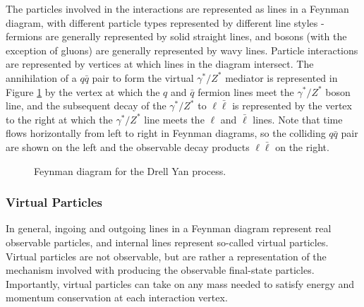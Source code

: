 The particles involved in the interactions are represented as lines in a Feynman diagram, with different particle types represented by different line styles - fermions are generally represented by solid straight lines, and bosons (with the exception of gluons) are generally represented by wavy lines. Particle interactions are represented by vertices at which lines in the diagram intersect. The annihilation of a \(q\bar{q}\) pair to form the virtual \(\gamma^{*}/Z^{*}\) mediator is represented in Figure \ref{fig:drell_yan} by the vertex at which the \(q\) and \(\bar{q}\) fermion lines meet the \(\gamma^{*}/Z^{*}\) boson line, and the subsequent decay of the  \(\gamma^{*}/Z^{*}\) to \(\ell\bar{\ell}\) is represented by the vertex to the right at which the \(\gamma^{*}/Z^{*}\) line meets the \(\ell\) and \(\bar{\ell}\) lines. Note that time flows horizontally from left to right in Feynman diagrams, so the colliding \(q\bar{q}\) pair are shown on the left and the observable decay products \(\ell\bar{\ell}\) on the right.

\begin{figure}[h]
	\centering
	\caption{Feynman diagram for the Drell Yan process.}
	\label{fig:drell_yan}
\end{figure}

\subsubsection{Virtual Particles}
\label{sec:virtual_particles}

In general, ingoing and outgoing lines in a Feynman diagram represent real observable particles, and internal lines represent so-called virtual particles. Virtual particles are not observable, but are rather a representation of the mechanism involved with producing the observable final-state particles. Importantly, virtual particles can take on any mass needed to satisfy energy and momentum conservation at each interaction vertex.

